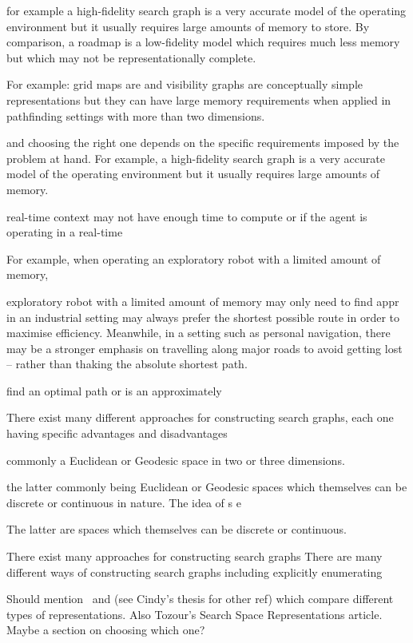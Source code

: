  for example a high-fidelity search graph
is a very accurate model of the operating environment but it usually
requires large amounts of memory to store. 
By comparison, a roadmap is a low-fidelity model which requires
much less memory but which may not be representationally complete.

For example: grid maps are and visibility graphs are conceptually simple 
representations but they can have large memory requirements when applied 
in pathfinding settings with more than two dimensions.

and choosing the right one depends on the specific requirements
imposed by the problem at hand. For example, a high-fidelity 
search graph is a very accurate model of the operating
environment but it usually requires large amounts of memory.

real-time context may not have enough time to compute
or if the agent is operating in a real-time 

For example, when operating
an exploratory robot with a limited amount of memory, 

 exploratory 
robot with a limited amount of memory may only need to find appr
in an industrial setting may always prefer the shortest possible
route in order to maximise efficiency. Meanwhile, in a setting such
as personal navigation, there may be a stronger emphasis on travelling
along major roads to avoid getting lost -- rather than thaking the 
absolute shortest path. 

find an optimal path or is an approximately 


There exist many different approaches for constructing search graphs, 
each one having specific advantages and disadvantages


commonly a Euclidean or Geodesic space in two or three dimensions.

the
latter commonly being Euclidean or Geodesic spaces which themselves 
can be discrete or continuous in nature.
The idea of s e

The latter are spaces which themselves can be discrete or continuous.

There exist many approaches for constructing search graphs
There are many different ways of constructing search graphs including
explicitly enumerating 

Should mention~\citep{yap02} and (see Cindy's thesis for other ref) which 
compare different types of representations. Also Tozour's Search Space Representations
article.
Maybe a section on choosing which one?
